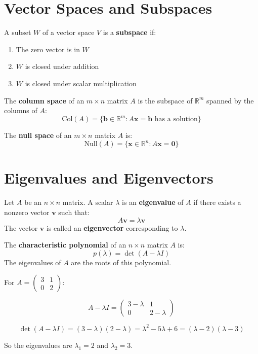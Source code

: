 \section{Vector Spaces and Subspaces}

\begin{definition}[Subspace]
A subset $W$ of a vector space $V$ is a \textbf{subspace} if:
\begin{enumerate}
    \item The zero vector is in $W$
    \item $W$ is closed under addition
    \item $W$ is closed under scalar multiplication
\end{enumerate}
\end{definition}

\begin{example}
The \textbf{column space} of an $m \times n$ matrix $A$ is the subspace of $\mathbb{R}^m$ spanned by the columns of $A$:
\[\text{Col}(A) = \{\mathbf{b} \in \mathbb{R}^m : A\mathbf{x} = \mathbf{b} \text{ has a solution}\}\]
\end{example}

\begin{definition}
The \textbf{null space} of an $m \times n$ matrix $A$ is:
\[\text{Null}(A) = \{\mathbf{x} \in \mathbb{R}^n : A\mathbf{x} = \mathbf{0}\}\]
\end{definition}

\section{Eigenvalues and Eigenvectors}

\begin{definition}
Let $A$ be an $n \times n$ matrix. A scalar $\lambda$ is an \textbf{eigenvalue} of $A$ if there exists a nonzero vector $\mathbf{v}$ such that:
\[A\mathbf{v} = \lambda\mathbf{v}\]
The vector $\mathbf{v}$ is called an \textbf{eigenvector} corresponding to $\lambda$.
\end{definition}

\begin{definition}
The \textbf{characteristic polynomial} of an $n \times n$ matrix $A$ is:
\[p(\lambda) = \det(A - \lambda I)\]
The eigenvalues of $A$ are the roots of this polynomial.
\end{definition}

\begin{example}
For $A = \begin{pmatrix} 3 & 1 \\ 0 & 2 \end{pmatrix}$:

\[A - \lambda I = \begin{pmatrix} 3-\lambda & 1 \\ 0 & 2-\lambda \end{pmatrix}\]

\[\det(A - \lambda I) = (3-\lambda)(2-\lambda) = \lambda^2 - 5\lambda + 6 = (\lambda-2)(\lambda-3)\]

So the eigenvalues are $\lambda_1 = 2$ and $\lambda_2 = 3$.
\end{example}

